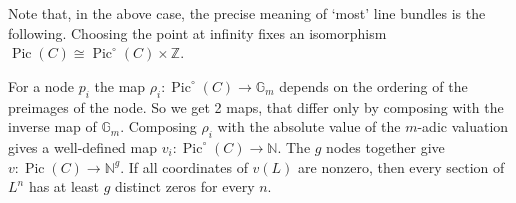\documentclass{amsart}
\newtheorem{lem}[thm]{Lemma}
\theoremstyle{definition}
\theoremstyle{remark}
\renewcommand{\o}[0]{{\mathcal O}}
\newcommand{\z}[0]{{\mathbb Z}}
\newcommand{\n}[0]{{\mathbb N}}
\newcommand{\qtq}[1]{\quad\mbox{#1}\quad}
\newcommand{\spec}[0]{\operatorname{Spec}}
\newcommand{\pic}[0]{\operatorname{Pic}}
\newcommand{\mg}[0]{{\mathbb G}_m}
\begin{document}
Note that, in the above case, the precise meaning of `most' line bundles is the following.
Choosing the point at infinity fixes an isomorphism
$\pic(C)\cong \pic^\circ(C)\times \z$.

For a  node $p_i$ the map $\rho_i:\pic^\circ(C)\to \mg$ depends on the ordering of the preimages of the node. So we get 2 maps, that differ only by composing with the inverse map of $\mg$.  Composing $\rho_i$ with the absolute value of the $m$-adic valuation gives a well-defined map
$v_i:\pic^\circ(C)\to \n$. The $g$ nodes together give
$v:\pic(C)\to \n^g$.  If all coordinates of $v(L)$ are nonzero, then
every section of $L^n$ has at least $g$ distinct zeros for every $n$.







\end{document}
